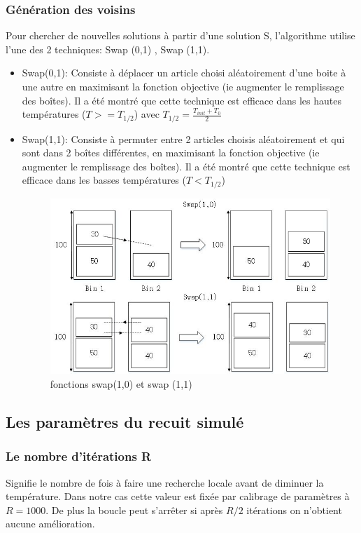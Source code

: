 \documentclass[12pt]{article}
\begin{document}
\subsubsection{Génération des voisins}
Pour chercher de nouvelles solutions à partir d’une solution S, l’algorithme utilise l’une des 2 techniques: Swap (0,1) , Swap (1,1). 
\begin{itemize}
    \item Swap(0,1): Consiste à déplacer un article choisi aléatoirement d’une boite à une autre 
    en maximisant la fonction objective (ie augmenter le remplissage des boîtes). 
    Il a été montré que cette technique est efficace dans les hautes températures ($T>=T_{1/2}$) avec $ T_{1/2} = \frac{T_{init}+T_{0}}{2}$ 
    \item Swap(1,1): Consiste à permuter entre 2 articles choisis aléatoirement et qui sont dans 2 boîtes différentes, en maximisant la fonction objective (ie augmenter le remplissage des boîtes).
     Il a été montré que cette technique est efficace dans les basses températures ($T<T_{1/2}$)
\begin{figure}[H]
    \includegraphics[width=\linewidth]{../figures/RS_SWAP.png}
    \caption{fonctions swap(1,0) et swap (1,1) \cite{sonuc2017solving}}
    \label{fig:swap}
\end{figure}
\end{itemize}
\subsection{Les paramètres du recuit simulé }
\subsubsection{Le nombre d'itérations R}
Signifie le nombre de fois à faire une recherche locale avant de diminuer la température. Dans notre cas cette valeur est fixée par calibrage de paramètres à $R = 1000$.
 De plus la boucle peut s’arrêter si après $R/2$ itérations on n'obtient aucune amélioration.
\end{document}
